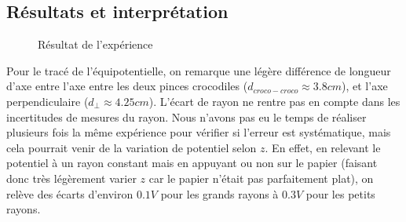 \documentclass[12pt]{article}
\begin{document}
	\subsection{Résultats et interprétation}
	\begin{figure}[!htbp]
		\centering
		\hfill
		\caption{Résultat de l'expérience}
	\end{figure}
	Pour le tracé de l'équipotentielle, on remarque une légère différence de longueur d'axe entre l'axe entre les deux pinces crocodiles ($d_{croco-croco} \approx 3.8cm$), et l'axe perpendiculaire ($d_{\perp}\approx 4.25cm$).
	L'écart de rayon ne rentre pas en compte dans les incertitudes de mesures du rayon. Nous n'avons pas eu le temps de réaliser plusieurs fois la même expérience pour vérifier si l'erreur est systématique, mais cela pourrait venir de la variation de potentiel selon $z$. En effet, en relevant le potentiel à un rayon constant
	mais en appuyant ou non sur le papier (faisant donc très légèrement varier $z$ car le papier n'était pas parfaitement plat), on relève des écarts d'environ $0.1V$ pour les grands rayons à $0.3V$ pour les petits rayons.
	
\end{document}
